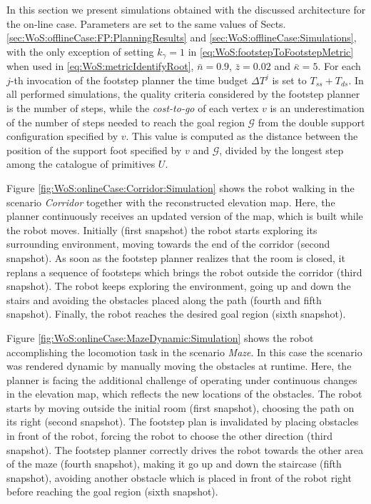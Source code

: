 In this section we present simulations obtained with the discussed architecture for the on-line case. Parameters are set to the same values of Sects. \ref{sec:WoS:offlineCase:FP:PlanningResults} and \ref{sec:WoS:offlineCase:Simulations}, with the only exception of setting $k_\gamma = 1$ in \eqref{eq:WoS:footstepToFootstepMetric} when used in \eqref{eq:WoS:metricIdentifyRoot}, $\bar{n}=0.9$, $\bar{z}=0.02$ and ${\bar{\kappa}}=5$. For each $j$-th invocation of the footstep planner the time budget $\Delta T^j$ is set to $T_{ss}+T_{ds}$. In all performed simulations, the quality criteria considered by the footstep planner is the number of steps, while the \textit{cost-to-go} of each vertex $v$ is an underestimation of the number of steps needed to reach the goal region $\mathcal{G}$ from the double support configuration specified by $v$. This value is computed as the distance between the position of the support foot specified by $v$ and $\mathcal{G}$, divided by the longest step among the catalogue of primitives $U$. 

Figure \ref{fig:WoS:onlineCase:Corridor:Simulation} shows the robot walking in the scenario \textit{Corridor} together with the reconstructed elevation map. Here, the planner continuously receives an updated version of the map, which is built while the robot moves. Initially (first snapshot) the robot starts exploring its surrounding environment, moving towards the end of the corridor (second snapshot). As soon as the footstep planner realizes that the room is closed, it replans a sequence of footsteps which brings the robot outside the corridor (third snapshot). The robot keeps exploring the environment, going up and down the stairs and avoiding the obstacles placed along the path (fourth and fifth snapshot). Finally, the robot reaches the desired goal region (sixth snapshot).

Figure \ref{fig:WoS:onlineCase:MazeDynamic:Simulation} shows the robot accomplishing the locomotion task in the scenario \textit{Maze}. In this case the scenario was rendered dynamic by manually moving the obstacles at runtime. Here, the planner is facing the additional challenge of operating under continuous changes in the elevation map, which reflects the new locations of the obstacles. The robot starts by moving outside the initial room (first snapshot), choosing the path on its right (second snapshot). The footstep plan is invalidated by placing obstacles in front of the robot, forcing the robot to choose the other direction (third snapshot). The footstep planner correctly drives the robot towards the other area of the maze (fourth snapshot), making it go up and down the staircase (fifth snapshot), avoiding another obstacle which is placed in front of the robot right before reaching the goal region (sixth snapshot).

